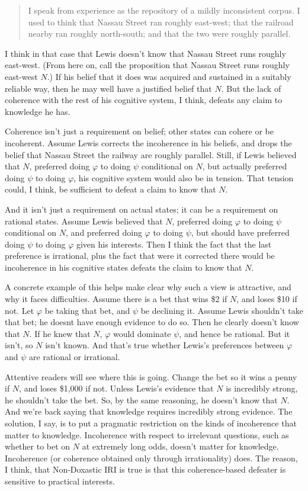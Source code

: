 \documentclass[11pt,oneside]{book}
\begin{document}
\begin{quote}
I speak from experience as the repository of a mildly inconsistent corpus. I used to think that Nassau Street ran roughly east-west; that the railroad nearby ran roughly north-south; and that the two were roughly parallel. \citep[436]{Lewis1982c} 
\end{quote}

\noindent I think in that case that Lewis doesn't know that Nassau Street runs roughly east-west. (From here on, call the proposition that Nassau Street runs roughly east-west $N$.) If his belief that it does was acquired and sustained in a suitably reliable way, then he may well have a justified belief that $N$. But the lack of coherence with the rest of his cognitive system, I think, defeats any claim to knowledge he has.

Coherence isn't just a requirement on belief; other states can cohere or be incoherent. Assume Lewis corrects the incoherence in his beliefs, and drops the belief that Nassau Street the railway are roughly parallel. Still, if Lewis believed that $N$, preferred doing $\varphi$ to doing $\psi$ conditional on $N$, but actually preferred doing $\psi$ to doing $\varphi$, his cognitive system would also be in tension. That tension could, I think, be sufficient to defeat a claim to know that $N$.

And it isn't just a requirement on actual states; it can be a requirement on rational states. Assume Lewis believed that $N$, preferred doing $\varphi$ to doing $\psi$ conditional on $N$, and preferred doing $\varphi$ to doing $\psi$, but should have preferred doing $\psi$ to doing $\varphi$ given his interests. Then I think the fact that the last preference is irrational, plus the fact that were it corrected there would be incoherence in his cognitive states defeats the claim to know that $N$.

A concrete example of this helps make clear why such a view is attractive, and why it faces difficulties. Assume there is a bet that wins \$2 if $N$, and loses \$10 if not. Let $\varphi$ be taking that bet, and $\psi$ be declining it. Assume Lewis shouldn't take that bet; he doesnt have enough evidence to do so. Then he clearly doesn't know that $N$. If he knew that $N$, $\varphi$ would dominate $\psi$, and hence be rational. But it isn't, so $N$ isn't known. And that's true whether Lewis's preferences between $\varphi$ and $\psi$ are rational or irrational.

Attentive readers will see where this is going. Change the bet so it wins a penny if $N$, and loses \$1,000 if not. Unless Lewis's evidence that $N$ is incredibly strong, he shouldn't take the bet. So, by the same reasoning, he doesn't know that $N$. And we're back saying that knowledge requires incredibly strong evidence. The solution, I say, is to put a pragmatic restriction on the kinds of incoherence that matter to knowledge. Incoherence with respect to irrelevant questions, such as whether to bet on $N$ at extremely long odds, doesn't matter for knowledge. Incoherence (or coherence obtained only through irrationality) does. The reason, I think, that Non-Doxastic IRI is true is that this coherence-based defeater is sensitive to practical interests.
\end{document}
